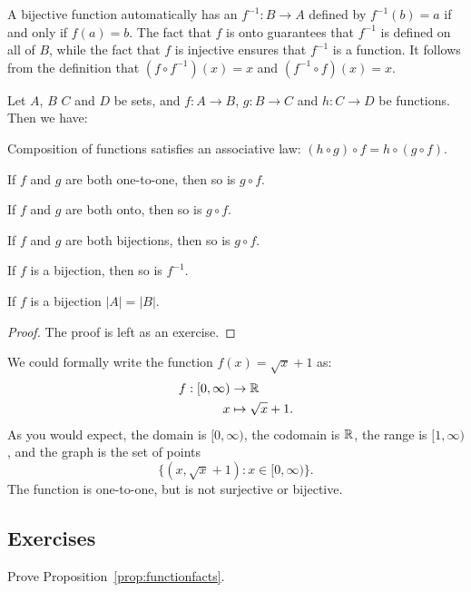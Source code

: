 A bijective function automatically has an  $f^{-1}: B \to A$ defined by $f^{-1}(b) = a$ if
and only if $f(a) = b$.  The fact that $f$ is onto guarantees that $f^{-1}$
is defined on all of $B$, while the fact that $f$ is injective ensures that
$f^{-1}$ is a function.  It follows from the definition that $(f \circ
f^{-1})(x) = x$ and $(f^{-1} \circ f)(x) = x$.

\begin{proposition}\label{prop:functionfacts}
  Let $A$, $B$ $C$ and $D$ be sets, and $f : A \to B$, $g : B \to C$ and
  $h: C \to D$ be functions.  Then we have:
  \begin{theoremenum}
    \item Composition of functions satisfies an associative law:
      $(h \circ g) \circ f = h \circ (g \circ f)$.
    \item If $f$ and $g$ are both one-to-one, then so is $g \circ f$.
    \item If $f$ and $g$ are both onto, then so is $g \circ f$.
    \item If $f$ and $g$ are both bijections, then so is $g \circ f$.
    \item If $f$ is a bijection, then so is $f^{-1}$.
    \item If $f$ is a bijection $|A| = |B|$.
  \end{theoremenum}
\end{proposition}
\begin{proof}
  The proof is left as an exercise.
\end{proof}

\begin{example}
We could formally write the function $f(x) = \sqrt{x}
+ 1$ as:
\begin{align*}
  f : [0,\infty) &\to \mathbb{R} \\
      x &\mapsto \sqrt{x} + 1.
\end{align*}
As you would expect, the domain is $[0,\infty)$, the codomain is $\mathbb{R}$,
the range is $[1, \infty)$, and the graph is the set of points
\[
  \{(x, \sqrt{x} + 1) : x \in [0,\infty)\}.
\]
The function is one-to-one, but is not surjective or bijective.
\end{example}

\subsection*{Exercises}

\begin{exercises}
  \item Prove Proposition~\ref{prop:functionfacts}.
\end{exercises}


